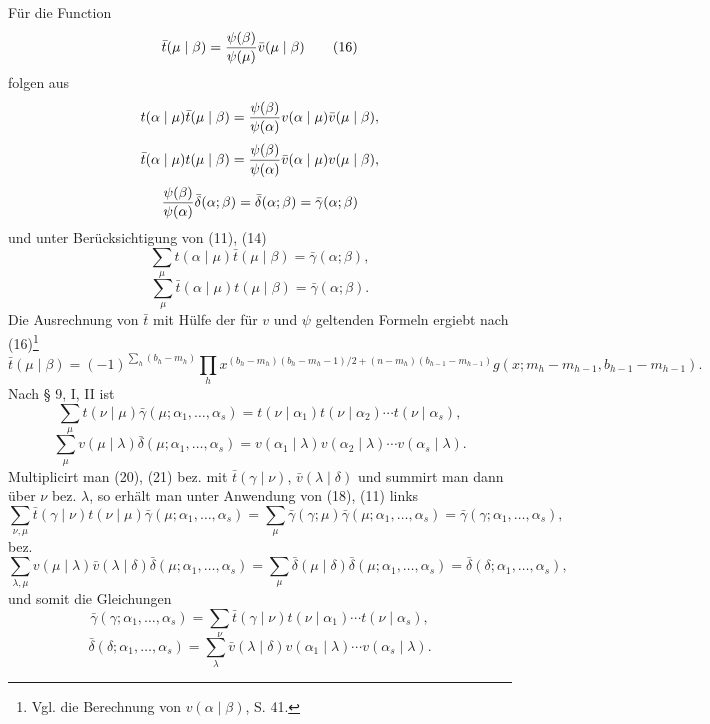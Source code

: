 \documentclass[11pt,a4paper]{article}
\begin{document}
Für die Function
\begin{equation}
 \bar t(\mu\mid\beta)={\psi(\beta)\over\psi(\mu)}\bar v(\mu\mid\beta)
\tag{16}
\end{equation}
folgen aus
\[
 t(\alpha\mid\mu)\bar t(\mu\mid\beta)
 ={\psi(\beta)\over\psi(\alpha)}v(\alpha\mid\mu)\bar v(\mu\mid\beta),
\]
\[
 \bar t(\alpha\mid\mu)t(\mu\mid\beta)
 ={\psi(\beta)\over\psi(\alpha)}\bar v(\alpha\mid\mu)v(\mu\mid\beta),
\]
\[
 {\psi(\beta)\over\psi(\alpha)}\bar\delta(\alpha;\beta)=\bar\delta(\alpha;\beta)=\bar\gamma(\alpha;\beta)
\]
und unter Berücksichtigung von (11), (14)
\begin{equation}
 \sum_\mu t(\alpha\mid\mu)\bar t(\mu\mid\beta)=\bar\gamma(\alpha;\beta),
\tag{17}
\end{equation}
\begin{equation}
 \sum_\mu\bar t(\alpha\mid\mu)t(\mu\mid\beta)=\bar\gamma(\alpha;\beta).
\tag{18}
\end{equation}
Die Ausrechnung von $\bar t$ mit Hülfe der für $v$ und $\psi$ geltenden Formeln ergiebt nach (16)\footnote{Vgl. die Berechnung von $v(\alpha\mid\beta)$, S. 41.}
\begin{equation}
 \bar t(\mu\mid\beta)=(-1)^{\sum_h(b_h-m_h)}
 \prod_h x^{(b_h-m_h)(b_h-m_h-1)/2+(n-m_h)(b_{h-1}-m_{h-1})}
 g(x;m_h-m_{h-1},b_{h-1}-m_{h-1}).
\tag{19}
\end{equation}
Nach § 9, I, II ist
\begin{equation}
 \sum_\mu t(\nu\mid\mu)\bar\gamma(\mu;\alpha_1,\ldots,\alpha_s)
 =t(\nu\mid\alpha_1)t(\nu\mid\alpha_2)\cdots t(\nu\mid\alpha_s),
\tag{20}
\end{equation}
\begin{equation}
 \sum_\mu v(\mu\mid\lambda)\bar\delta(\mu;\alpha_1,\ldots,\alpha_s)
 =v(\alpha_1\mid\lambda)v(\alpha_2\mid\lambda)\cdots v(\alpha_s\mid\lambda).
\tag{21}
\end{equation}
Multiplicirt man (20), (21) bez. mit $\bar t(\gamma\mid\nu)$, $\bar v(\lambda\mid\delta)$ und summirt man dann über $\nu$ bez. $\lambda$, so erhält man unter Anwendung von (18), (11) links
\[
 \sum_{\nu,\mu}\bar t(\gamma\mid\nu)t(\nu\mid\mu)\bar\gamma(\mu;\alpha_1,\ldots,\alpha_s)
 =\sum_\mu\bar\gamma(\gamma;\mu)\bar\gamma(\mu;\alpha_1,\ldots,\alpha_s)
 =\bar\gamma(\gamma;\alpha_1,\ldots,\alpha_s),
\]
bez.
\[
 \sum_{\lambda,\mu}v(\mu\mid\lambda)\bar v(\lambda\mid\delta)\bar\delta(\mu;\alpha_1,\ldots,\alpha_s)
 =\sum_\mu\bar\delta(\mu\mid\delta)\bar\delta(\mu;\alpha_1,\ldots,\alpha_s)
 =\bar\delta(\delta;\alpha_1,\ldots,\alpha_s),
\]
und somit die Gleichungen
\begin{equation}
 \bar\gamma(\gamma;\alpha_1,
\ldots,\alpha_s)=\sum_\nu \bar t(\gamma\mid\nu)t(\nu\mid\alpha_1)\cdots t(\nu\mid\alpha_s),
\tag{22}
\end{equation}
\begin{equation}
 \bar\delta(\delta;\alpha_1,
\ldots,\alpha_s)=\sum_\lambda \bar v(\lambda\mid\delta)v(\alpha_1\mid\lambda)\cdots v(\alpha_s\mid\lambda).
\tag{23}
\end{equation}
\end{document}

